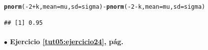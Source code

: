 \documentclass[10pt,a4paper]{article}\usepackage[]{graphicx}\usepackage[]{color}
\makeatletter
\newcommand{\hlnum}[1]{\textcolor[rgb]{0.686,0.059,0.569}{#1}}%
\newcommand{\hlopt}[1]{\textcolor[rgb]{0,0,0}{#1}}%
\newcommand{\hlstd}[1]{\textcolor[rgb]{0.345,0.345,0.345}{#1}}%
\newcommand{\hlkwc}[1]{\textcolor[rgb]{0.333,0.667,0.333}{#1}}%
\newcommand{\hlkwd}[1]{\textcolor[rgb]{0.737,0.353,0.396}{\textbf{#1}}}%
\newenvironment{kframe}{%
 \def\at@end@of@kframe{}%
 \ifinner\ifhmode%
  \def\at@end@of@kframe{\end{minipage}}%
  \begin{minipage}{\columnwidth}%
 \fi\fi%
 \def\FrameCommand##1{\hskip\@totalleftmargin \hskip-\fboxsep
 \colorbox{shadecolor}{##1}\hskip-\fboxsep
     \hskip-\linewidth \hskip-\@totalleftmargin \hskip\columnwidth}%
 \MakeFramed {\advance\hsize-\width
   \@totalleftmargin\z@ \linewidth\hsize
   \@setminipage}}%
 {\par\unskip\endMakeFramed%
 \at@end@of@kframe}
\newenvironment{knitrout}{}{} %
\makeatother
\begin{document}
\begin{enumerate}
\begin{knitrout}
\color{fgcolor}\begin{kframe}
\begin{alltt}
    \hlkwd{pnorm}\hlstd{(}\hlopt{-}\hlnum{2} \hlopt{+} \hlstd{k,} \hlkwc{mean}\hlstd{=mu,} \hlkwc{sd}\hlstd{=sigma)} \hlopt{-} \hlkwd{pnorm}\hlstd{(}\hlopt{-}\hlnum{2} \hlopt{-} \hlstd{k,} \hlkwc{mean}\hlstd{=mu,} \hlkwc{sd}\hlstd{=sigma)}
\end{alltt}
\begin{verbatim}
## [1] 0.95
\end{verbatim}
\end{kframe}
\end{knitrout}



\end{enumerate}

\paragraph{\bf $\bullet$ Ejercicio \ref{tut05:ejercicio24}, pág. \pageref{tut05:ejercicio24}}
\label{tut05:ejercicio24:sol}\quad\\
\end{document}
